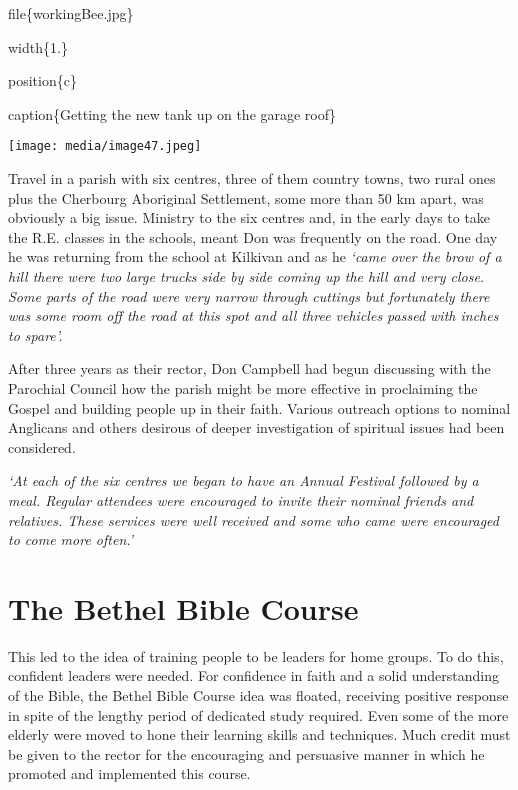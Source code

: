 file\{workingBee.jpg\}

width\{1.\}

position\{c\}

caption\{Getting the new tank up on the garage roof\}

\texttt{[image: media/image47.jpeg]}

Travel in a parish with six centres, three of them country towns, two rural ones plus the Cherbourg Aboriginal Settlement, some more than 50 km apart, was obviously a big issue. Ministry to the six centres and, in the early days to take the R.E. classes in the schools, meant Don was frequently on the road. One day he was returning from the school at Kilkivan and as he \emph{`came over the brow of a hill there were two large trucks side by side coming up the hill and very close. Some parts of the road were very narrow through cuttings but fortunately there was some room off the road at this spot and all three vehicles passed with inches to spare'.}

After three years as their rector, Don Campbell had begun discussing with the Parochial Council how the parish might be more effective in proclaiming the Gospel and building people up in their faith. Various outreach options to nominal Anglicans and others desirous of deeper investigation of spiritual issues had been considered.

\emph{`At each of the six centres we began to have an Annual Festival followed by a meal. Regular attendees were encouraged to invite their nominal friends and relatives. These services were well received and some who came were encouraged to come more often.'}

\hypertarget{the-bethel-bible-course}{%
\section{The Bethel Bible Course}\label{the-bethel-bible-course}}

This led to the idea of training people to be leaders for home groups. To do this, confident leaders were needed. For confidence in faith and a solid understanding of the Bible, the Bethel Bible Course idea was floated, receiving positive response in spite of the lengthy period of dedicated study required. Even some of the more elderly were moved to hone their learning skills and techniques. Much credit must be given to the rector for the encouraging and persuasive manner in which he promoted and implemented this course.

